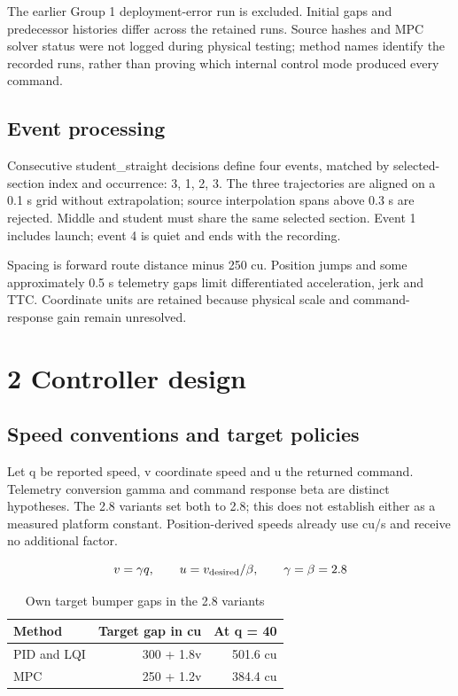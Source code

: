 \documentclass[11pt,a4paper]{article}
\begin{document}
The earlier Group 1 deployment-error run is excluded. Initial gaps and predecessor histories differ across the retained runs. Source hashes and MPC solver status were not logged during physical testing; method names identify the recorded runs, rather than proving which internal control mode produced every command.


\subsection*{Event processing}

Consecutive student\_straight decisions define four events, matched by selected-section index and occurrence: 3, 1, 2, 3. The three trajectories are aligned on a 0.1 s grid without extrapolation; source interpolation spans above 0.3 s are rejected. Middle and student must share the same selected section. Event 1 includes launch; event 4 is quiet and ends with the recording.


Spacing is forward route distance minus 250 cu. Position jumps and some approximately 0.5 s telemetry gaps limit differentiated acceleration, jerk and TTC. Coordinate units are retained because physical scale and command-response gain remain unresolved.


\newpage

\section*{2 Controller design}

\subsection*{Speed conventions and target policies}

Let q be reported speed, v coordinate speed and u the returned command. Telemetry conversion gamma and command response beta are distinct hypotheses. The 2.8 variants set both to 2.8; this does not establish either as a measured platform constant. Position-derived speeds already use cu/s and receive no additional factor.


\[
v=\gamma q,\qquad u=v_{\rm desired}/\beta,\qquad \gamma=\beta=2.8
\]

\begin{table}[H]\centering\small\caption{Own target bumper gaps in the 2.8 variants}
\begin{tabular}{lrr}
\toprule
Method & Target gap in cu & At q = 40 \\
\midrule

PID and LQI & 300 + 1.8v & 501.6 cu \\

MPC & 250 + 1.2v & 384.4 cu \\

\bottomrule\end{tabular}\end{table}
\end{document}

